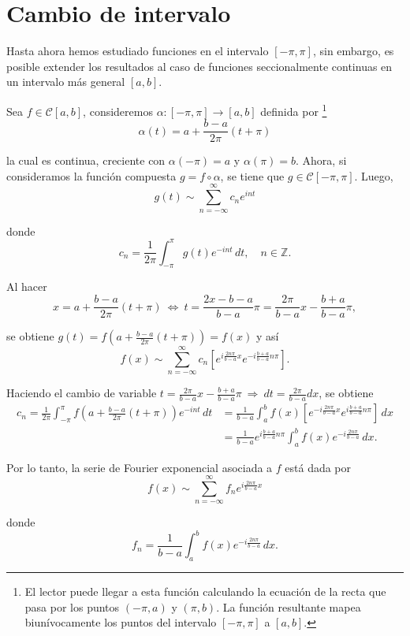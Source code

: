 \section{Cambio de intervalo}

Hasta ahora hemos estudiado funciones en el intervalo $[-\pi,\pi]$, sin embargo, es posible extender los resultados al caso de funciones seccionalmente continuas en un intervalo más general $[a,b]$. 

Sea $f \in \mathcal{C}[a,b]$, consideremos $\alpha: [- \pi,\pi] \longrightarrow [a,b]$ definida por \footnote{El lector puede llegar a esta función calculando la ecuación de la recta que pasa por los puntos $(-\pi,a)$ y $(\pi,b)$. La función resultante mapea biunívocamente los puntos del intervalo $[-\pi,\pi]$ a $[a,b]$.} 
$$\alpha(t) = a + \frac{b-a}{2\pi} (t+\pi)$$

la cual es continua, creciente con $\alpha(-\pi) = a$ y $\alpha(\pi) = b$. Ahora, si consideramos la función compuesta $g = f \circ \alpha$, se tiene que $g \in \mathcal{C}[-\pi,\pi]$. Luego, 
$$g(t) \sim \sum_{n= - \infty}^{\infty} c_n e^{int}$$

donde 
$$c_n = \frac{1}{2\pi} \int_{-\pi}^{\pi} g(t) e^{-int} \,dt, \quad n \in \mathbb{Z}.$$

Al hacer 
$$x = a + \frac{b-a}{2\pi} (t+\pi) ~\Leftrightarrow~ t = \frac{2x-b-a}{b-a} \pi = \frac{2 \pi}{b-a} x - \frac{b+a}{b-a} \pi  ,$$

se obtiene $g(t) = f(a + \frac{b-a}{2\pi} (t+\pi)) = f(x)$ y así 
$$f(x) \sim \sum_{n=-\infty}^{\infty} c_n \left[ e^{i\frac{2n\pi}{b-a} x} e^{-i \frac{b+a}{b-a}n\pi}\right].$$

Haciendo el cambio de variable $t = \frac{2\pi}{b-a} x - \frac{b+a}{b-a} \pi ~\Rightarrow~ dt = \frac{2\pi}{b-a} dx$, se obtiene
\begin{align*}
 c_n = \frac{1}{2\pi} \int_{-\pi}^{\pi} f(a + \frac{b-a}{2\pi} (t+\pi)) e^{-int} \,dt   &= \frac{1}{b-a} \int_a^b f(x) \left[ e^{-i\frac{2n\pi}{b-a} x} e^{i \frac{b+a}{b-a}n\pi}\right] \,dx \\
 &= \frac{1}{b-a} e^{i \frac{b+a}{b-a}n\pi} \int_a^b f(x) e^{-i \frac{2n\pi}{b-a}} \,dx.
\end{align*}

Por lo tanto, la serie de Fourier exponencial asociada a $f$ está dada por 
$$f(x) \sim \sum_{n=-\infty}^{\infty} f_n e^{i \frac{2n\pi}{b-a}x} $$

donde 
$$f_n = \frac{1}{b-a} \int_a^b f(x) e^{-i \frac{2n\pi}{b-a}} \,dx.$$

